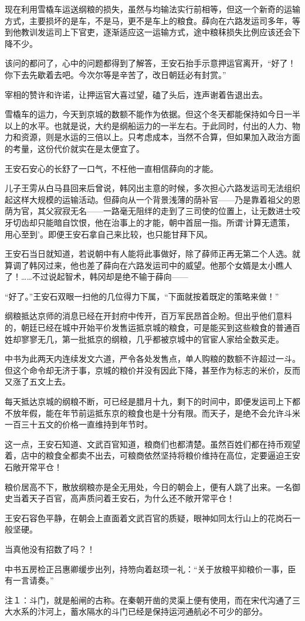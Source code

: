 现在利用雪橇车运送纲粮的损失，虽然与均输法实行前相等，但这一个新奇的运输方式，主要损坏的是车，不是马，更不是车上的粮食。薛向在六路发运司多年，等到他教训发运司上下官吏，逐渐适应这一运输方式，途中粮秣损失比例应该还会下降不少。

该问的都问了，心中的问题都得到了解答，王安石抬手示意押运官离开，“好了！你下去先歇着去吧。今次尔等是辛苦了，改日朝廷必有封赏。”

宰相的赞许和许诺，让押运官大喜过望，磕了头后，连声谢着告退出去。

雪橇车的运力，今天到京城的数额不能作为依据。但这个冬天都能保持如今日一半以上的水平。也就是说，大约是纲船运力的一半左右。于此同时，付出的人力、物力和资源，则是水运的三倍以上。只考虑成本，当然不合算，但如果加入政治方面的考量，这份代价就实在是太便宜了。

王安石安心的长舒了一口气，不枉他一直相信薛向的才能。

儿子王雱从白马县回来后曾说，韩冈出主意的时候，多次担心六路发运司无法组织起这样大规模的运输活动。但薛向从一个背景浅薄的荫补官——乃是靠着祖父的恩荫为官，其父寂寂无名——一路毫无阻绊的走到了三司使的位置上，让无数进士咬牙切齿却只能暗自饮恨，他在治事上的才能，朝中首屈一指。所谓‘计算无遗策，用心至到’。即便王安石拿自己来比较，也只能甘拜下风。

王安石当日就知道，若说朝中有人能将此事做好，除了薛师正再无第二个人选。就算调了韩冈过来，他也差了薛向在六路发运司中的威望。他那个女婿是太小瞧人了！……不过说起智术，韩冈却是绝不输于薛向——

“好了。”王安石双眼一扫他的几位得力下属，“下面就按着既定的策略来做！”

纲粮抵达京师的消息已经在开封府中传开，百万军民昂首企盼。但出乎他们意料的，朝廷已经在城中开始平价发售运抵京城的粮食，可是能买到这些粮食的普通百姓却寥寥无几，第一批抵京的纲粮，几乎都被京城中的官宦人家给全数买走。

中书为此两天内连续发文六道，严令各处发售点，单人购粮的数额不许超过一斗。但这个命令却无济于事，京城的粮价并没有因此下降，甚至作为标志的米价，反而又涨了五文上去。

每天抵达京城的纲粮不断，可已经是腊月十九，剩下的时间中，即便发运司上下都不放年假，能在年节前运抵东京的粮食也是十分有限。而天子，是绝不会允许斗米一百三十五文的价格一直维持到年节时。

这一点，王安石知道、文武百官知道，粮商们也都清楚。虽然百姓们都在持币观望着，店中的粮食全都卖不出去，可粮商依然坚持将粮价维持在高位，定要逼迫王安石敞开常平仓！

粮价居高不下，散放纲粮亦是全无用处，今日的朝会上，便有人跳了出来。一名御史当着天子百官，高声质问着王安石，为什么还不敞开常平仓！

王安石容色平静，在朝会上直面着文武百官的质疑，眼神如同太行山上的花岗石一般坚硬。

当真他没有招数了吗？！

中书五房检正吕惠卿缓步出列，持笏向着赵顼一礼：“关于放粮平抑粮价一事，臣有一言请奏。”

注１：斗门，就是船闸的古称。在秦朝开凿的灵渠上便有使用，而在宋代沟通了三大水系的汴河上，蓄水隔水的斗门已经是保持运河通航必不可少的部分。

